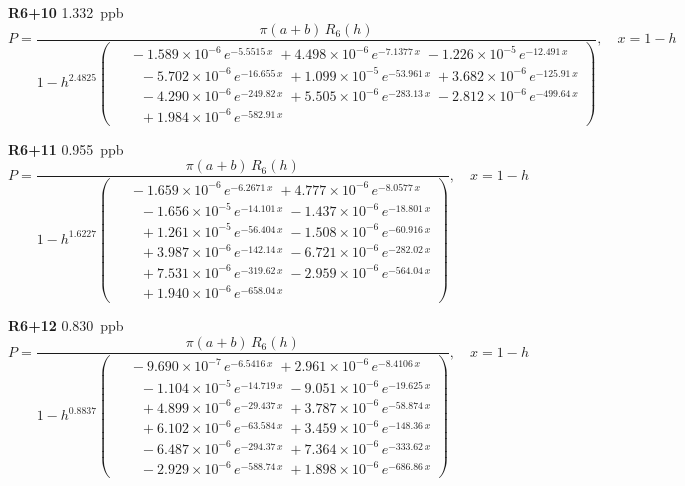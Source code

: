 \documentclass[12pt]{article}
\begin{document}
\noindent\textbf{R6+10} 1.332~ppb\nopagebreak
\begin{equation*}
P = \frac{\pi(a{+}b)\,R_6(h)}{1 - h^{2.4825}\!\left(\!\begin{aligned}
  &\; -1.589{\times}10^{-6}\,e^{-5.5515\,x} \; +4.498{\times}10^{-6}\,e^{-7.1377\,x} \; -1.226{\times}10^{-5}\,e^{-12.491\,x} \\[-3pt]
  &\quad -5.702{\times}10^{-6}\,e^{-16.655\,x} \; +1.099{\times}10^{-5}\,e^{-53.961\,x} \; +3.682{\times}10^{-6}\,e^{-125.91\,x} \\[-3pt]
  &\quad -4.290{\times}10^{-6}\,e^{-249.82\,x} \; +5.505{\times}10^{-6}\,e^{-283.13\,x} \; -2.812{\times}10^{-6}\,e^{-499.64\,x} \\[-3pt]
  &\quad +1.984{\times}10^{-6}\,e^{-582.91\,x}
\end{aligned}\!\right)}, \quad x = 1{-}h
\end{equation*}

\noindent\textbf{R6+11} 0.955~ppb\nopagebreak
\begin{equation*}
P = \frac{\pi(a{+}b)\,R_6(h)}{1 - h^{1.6227}\!\left(\!\begin{aligned}
  &\; -1.659{\times}10^{-6}\,e^{-6.2671\,x} \; +4.777{\times}10^{-6}\,e^{-8.0577\,x} \\[-3pt]
  &\quad -1.656{\times}10^{-5}\,e^{-14.101\,x} \; -1.437{\times}10^{-6}\,e^{-18.801\,x} \\[-3pt]
  &\quad +1.261{\times}10^{-5}\,e^{-56.404\,x} \; -1.508{\times}10^{-6}\,e^{-60.916\,x} \\[-3pt]
  &\quad +3.987{\times}10^{-6}\,e^{-142.14\,x} \; -6.721{\times}10^{-6}\,e^{-282.02\,x} \\[-3pt]
  &\quad +7.531{\times}10^{-6}\,e^{-319.62\,x} \; -2.959{\times}10^{-6}\,e^{-564.04\,x} \\[-3pt]
  &\quad +1.940{\times}10^{-6}\,e^{-658.04\,x}
\end{aligned}\!\right)}, \quad x = 1{-}h
\end{equation*}

\noindent\textbf{R6+12} 0.830~ppb\nopagebreak
\begin{equation*}
P = \frac{\pi(a{+}b)\,R_6(h)}{1 - h^{0.8837}\!\left(\!\begin{aligned}
  &\; -9.690{\times}10^{-7}\,e^{-6.5416\,x} \; +2.961{\times}10^{-6}\,e^{-8.4106\,x} \\[-3pt]
  &\quad -1.104{\times}10^{-5}\,e^{-14.719\,x} \; -9.051{\times}10^{-6}\,e^{-19.625\,x} \\[-3pt]
  &\quad +4.899{\times}10^{-6}\,e^{-29.437\,x} \; +3.787{\times}10^{-6}\,e^{-58.874\,x} \\[-3pt]
  &\quad +6.102{\times}10^{-6}\,e^{-63.584\,x} \; +3.459{\times}10^{-6}\,e^{-148.36\,x} \\[-3pt]
  &\quad -6.487{\times}10^{-6}\,e^{-294.37\,x} \; +7.364{\times}10^{-6}\,e^{-333.62\,x} \\[-3pt]
  &\quad -2.929{\times}10^{-6}\,e^{-588.74\,x} \; +1.898{\times}10^{-6}\,e^{-686.86\,x}
\end{aligned}\!\right)}, \quad x = 1{-}h
\end{equation*}
\end{document}

